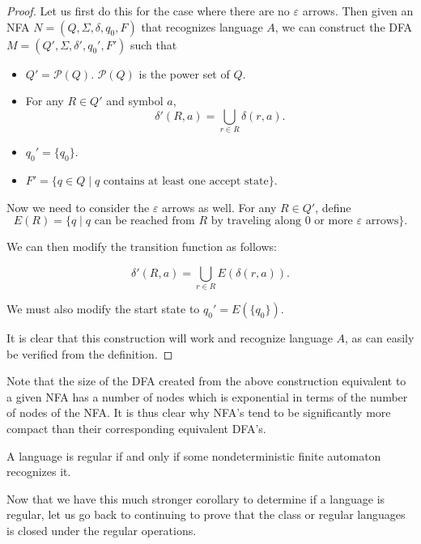 \begin{proof}
Let us first do this for the case where there are no $\varepsilon$ arrows. Then given an NFA $N=(Q,\Sigma,\delta,q_0,F)$ that recognizes language $A$, we can construct the DFA $M=(Q',\Sigma,\delta',q_0',F')$ such that
\begin{itemize}
	\item $Q'=\mathcal{P}(Q)$. $\mathcal{P}(Q)$ is the power set of $Q$.
	\item For any $R\in Q'$ and symbol $a$, $$\delta'(R,a)=\bigcup_{r\in R}\delta(r,a).$$
	\item $q_0'=\{q_0\}$.
	\item $F'=\{q\in Q\mid q\text{ contains at least one accept state}\}$.
\end{itemize}
Now we need to consider the $\varepsilon$ arrows as well. For any $R\in Q'$, define $$E(R)=\{q\mid q \text{ can be reached from $R$ by traveling along $0$ or more $\varepsilon$ arrows}\}.$$

We can then modify the transition function as follows:

$$\delta'(R,a)=\bigcup_{r\in R} E(\delta(r,a)).$$

We must also modify the start state to $q_0'=E(\{q_0\})$.

It is clear that this construction will work and recognize language $A$, as can easily be verified from the definition.
\end{proof}

Note that the size of the DFA created from the above construction equivalent to a given NFA has a number of nodes which is exponential in terms of the number of nodes of the NFA. It is thus clear why NFA's tend to be significantly more compact than their corresponding equivalent DFA's.

\begin{corollary}
A language is regular if and only if some nondeterministic finite automaton recognizes it.
\end{corollary}

Now that we have this much stronger corollary to determine if a language is regular, let us go back to continuing to prove that the class or regular languages is closed under the regular operations.

